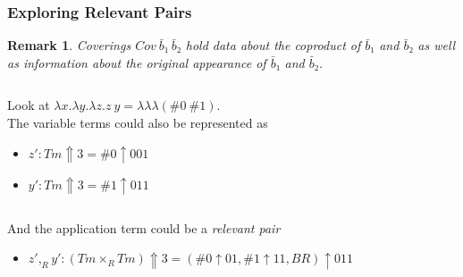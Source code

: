 \documentclass[aspectratio=169]{beamer}
\theoremstyle{remarkstyle}
\newtheorem*{remark}{Remark}
\begin{document}
\begin{frame}[fragile]
  \frametitle{Exploring Relevant Pairs}
  \begin{remark}
    Coverings $Cov \ \bar{b}₁ \ \bar{b}₂$ hold data about the coproduct of $\bar{b}₁$ and $\bar{b}₂$ as well as information about the original appearance of $\bar{b}₁$ and $\bar{b}₂$.
  \end{remark}
  \begin{example}
    \begin{columns}
      \begin{column}{0.56\textwidth}
          Look at $λx. λy. λz. z \ y = λ λ λ(\#0 \ \#1)$. \\
          The variable terms could also be represented as
          \begin{itemize}
            \item $z' : Tm ⇑ 3 = \#0 ↑ 001$
            \item $y' : Tm ⇑ 3 = \#1 ↑ 011$
          \end{itemize}
      \end{column}
      \begin{column}{0.44\textwidth}
      \end{column}
    \end{columns}
    And the application term could be a \emph{relevant pair} 
    \begin{itemize}
     \item $z' ,_R y' : (Tm ×_R Tm) ⇑ 3 = (\#0 ↑ 01, \#1 ↑ 11, BR) ↑ 011$
    \end{itemize}
  \end{example}
\end{frame}
\end{document}
